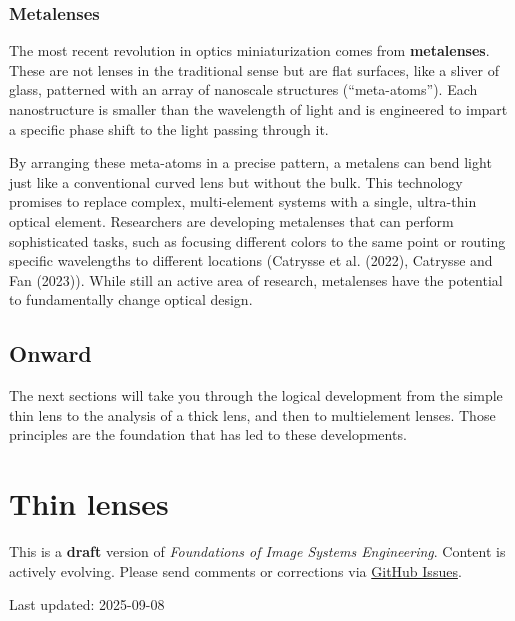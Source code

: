 \documentclass[
  letterpaper,
]{book}
\begin{document}
\subsection{Metalenses}\label{metalenses}

The most recent revolution in optics miniaturization comes from
\textbf{metalenses}. These are not lenses in the traditional sense but
are flat surfaces, like a sliver of glass, patterned with an array of
nanoscale structures (``meta-atoms''). Each nanostructure is smaller
than the wavelength of light and is engineered to impart a specific
phase shift to the light passing through it.

By arranging these meta-atoms in a precise pattern, a metalens can bend
light just like a conventional curved lens but without the bulk. This
technology promises to replace complex, multi-element systems with a
single, ultra-thin optical element. Researchers are developing
metalenses that can perform sophisticated tasks, such as focusing
different colors to the same point or routing specific wavelengths to
different locations (Catrysse et al. (2022), Catrysse and Fan (2023)).
While still an active area of research, metalenses have the potential to
fundamentally change optical design.

\section{Onward}\label{onward}

The next sections will take you through the logical development from the
simple thin lens to the analysis of a thick lens, and then to
multielement lenses. Those principles are the foundation that has led to
these developments.

\chapter{Thin lenses}\label{sec-optics-thinlens}

\begin{tcolorbox}[enhanced jigsaw, opacityback=0, breakable, coltitle=black, leftrule=.75mm, left=2mm, colframe=quarto-callout-warning-color-frame, opacitybacktitle=0.6, bottomtitle=1mm, bottomrule=.15mm, toprule=.15mm, title=\textcolor{quarto-callout-warning-color}{\faExclamationTriangle}\hspace{0.5em}{Work in Progress}, titlerule=0mm, toptitle=1mm, colback=white, rightrule=.15mm, colbacktitle=quarto-callout-warning-color!10!white, arc=.35mm]

This is a \textbf{draft} version of \emph{Foundations of Image Systems
Engineering}. Content is actively evolving. Please send comments or
corrections via \href{https://github.com/wandell/FISE-git/issues}{GitHub
Issues}.

Last updated: 2025-09-08

\end{tcolorbox}
\end{document}
